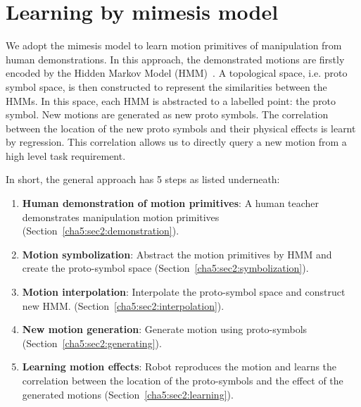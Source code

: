 \section{Learning by mimesis model}
\label{cha5:sec2}

We adopt the mimesis model to learn motion primitives of manipulation from human demonstrations. In this approach, the demonstrated motions are firstly encoded by the Hidden Markov Model (HMM)~\citep{rabiner1989tutorial}. A topological space, i.e. proto symbol space, is then constructed to represent the similarities between the HMMs. In this space, each HMM is abstracted to a labelled point: the proto symbol. New motions are generated as new proto symbols. The correlation between the location of the new proto symbols and their physical effects is learnt by regression. This correlation allows us to directly query a new motion from a high level task requirement.

In short, the general approach has 5 steps as listed underneath:

\begin{enumerate}
\item {\bf{Human demonstration of motion primitives}}: A human teacher demonstrates manipulation motion primitives (Section~\ref{cha5:sec2:demonstration}).
\item {\bf{Motion symbolization}}: Abstract the motion primitives by HMM and create the proto-symbol space (Section~\ref{cha5:sec2:symbolization}).
\item {\bf{Motion interpolation}}: Interpolate the proto-symbol space and construct new HMM.  (Section~\ref{cha5:sec2:interpolation}).
\item {\bf{New motion generation}}: Generate motion using proto-symbols (Section~\ref{cha5:sec2:generating}).
\item {\bf{Learning motion effects}}: Robot reproduces the motion and learns the correlation between the location of the proto-symbols and the effect of the generated motions (Section~\ref{cha5:sec2:learning}).
\end{enumerate}



